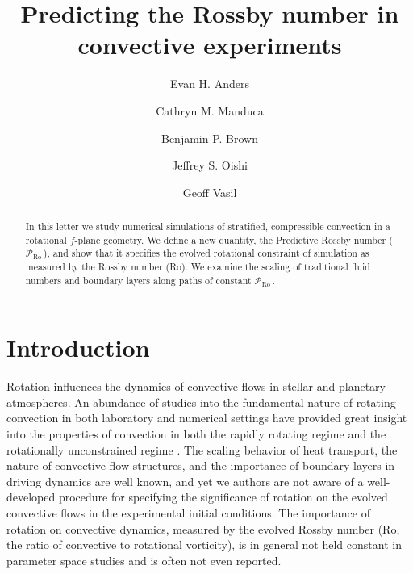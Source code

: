 \documentclass[twocolumn, amsmath, amsfonts, amssymb]{aastex62}
\newcommand{\pro}{\ensuremath{\mathcal{P}_{\text{Ro}}\,}}
\begin{document}
\newcommand{\AB}{\citetalias{anders&brown2017}}

\title{Predicting the Rossby number in convective experiments}


\author{Evan H. Anders}
\author{Cathryn M. Manduca}
\author{Benjamin P. Brown}
\author{Jeffrey S. Oishi}
\author{Geoff Vasil}


\begin{abstract}
In this letter we study numerical simulations of stratified, compressible convection in a
rotational $f$-plane geometry. We define a new quantity, the Predictive Rossby number
(\pro), and show that it specifies the evolved rotational constraint of simulation as
measured by the Rossby number (Ro).
We examine the scaling of traditional fluid numbers and boundary layers along paths of constant
\pro.
\end{abstract}


\section{Introduction}
\label{sec:intro}
Rotation influences the dynamics of convective flows in
stellar and planetary atmospheres.
An abundance of studies into the fundamental nature of
rotating convection in both laboratory and numerical settings
have provided great insight into the properties of convection 
in both the rapidly rotating regime 
\citep{julien&all2012, stellmach&all2014, gastine&all2016}
and the rotationally unconstrained regime \citep{king&all2009, zhong&all2009, 
cheng&all2015}. The scaling behavior of heat transport, the nature of convective flow
structures, and the importance of boundary layers in driving dynamics are well known,
and yet we authors are not aware of a well-developed
procedure for specifying the significance of rotation on the evolved
convective flows in the experimental initial conditions.
The importance of rotation on convective dynamics,
measured by the evolved Rossby number
(Ro, the ratio of convective to rotational vorticity),
is in general not held constant in parameter space studies and is often not even
reported.
\end{document}
